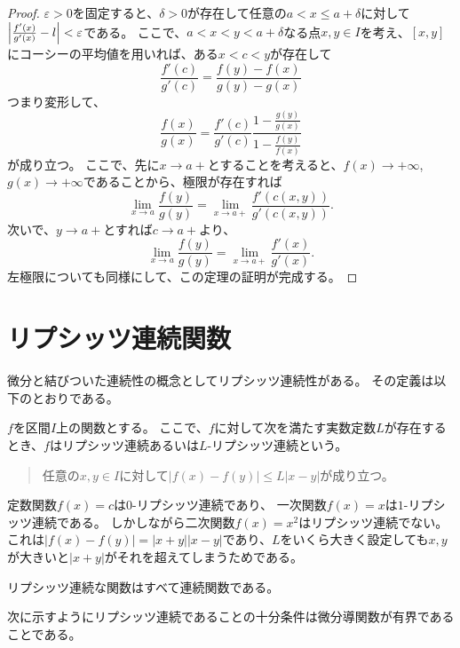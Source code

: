 \begin{proof}
$\varepsilon > 0$を固定すると、$\delta > 0$が存在して任意の$a < x \le a+\delta$に対して$\abs{\frac{f'(x)}{g'(x)}-l} < \varepsilon$である。
ここで、$a < x < y < a+\delta$なる点$x, y \in I$を考え、$[x, y]$にコーシーの平均値を用いれば、ある$x < c < y$が存在して
$$
\frac{f'(c)}{g'(c)} = \frac{f(y)-f(x)}{g(y)-g(x)}
$$
つまり変形して、
$$
\frac{f(x)}{g(x)} = \frac{f'(c)}{g'(c)}\frac{1-\frac{g(y)}{g(x)}}{1-\frac{f(y)}{f(x)}}
$$
が成り立つ。
ここで、先に$x \to a+$とすることを考えると、$f(x) \to +\infty$, $g(x) \to +\infty$であることから、極限が存在すれば
$$
\lim_{x \to a}\frac{f(y)}{g(y)} = \lim_{x \to a+}\frac{f'(c(x, y))}{g'(c(x, y))}.
$$
次いで、$y \to a+$とすれば$c \to a+$より、
$$
\lim_{x \to a}\frac{f(y)}{g(y)} = \lim_{x \to a+}\frac{f'(x)}{g'(x)}.
$$
左極限についても同様にして、この定理の証明が完成する。
\end{proof}

\section{リプシッツ連続関数}

微分と結びついた連続性の概念としてリプシッツ連続性がある。
その定義は以下のとおりである。

\begin{definition}[リプシッツ連続関数]
$f$を区間$I$上の関数とする。
ここで、$f$に対して次を満たす実数定数$L$が存在するとき、$f$はリプシッツ連続あるいは$L$-リプシッツ連続という。
\begin{quote}
任意の$x, y \in I$に対して$|f(x)-f(y)| \le L|x-y|$が成り立つ。
\end{quote}
\end{definition}

\begin{example}
定数関数$f(x) = c$は$0$-リプシッツ連続であり、
一次関数$f(x) = x$は$1$-リプシッツ連続である。
しかしながら二次関数$f(x) = x^2$はリプシッツ連続でない。
これは$|f(x)-f(y)| = |x+y||x-y|$であり、$L$をいくら大きく設定しても$x, y$が大きいと$|x+y|$がそれを超えてしまうためである。
\end{example}

\begin{remark}
リプシッツ連続な関数はすべて連続関数である。
\end{remark}

次に示すようにリプシッツ連続であることの十分条件は微分導関数が有界であることである。


